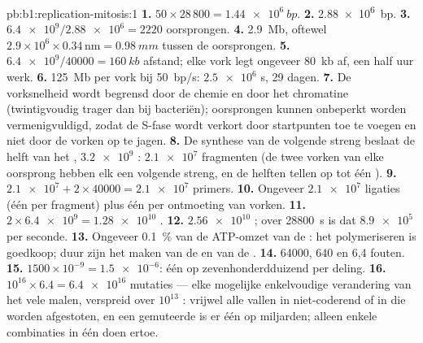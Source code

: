 \begin{solution}{pb:b1:replication-mitosis:1}
\textbf{1.} $50\times 28\,800 = \qty{1.44e6}{bp}$.
\textbf{2.} \qty{2.88e6}{bp}.
\textbf{3.} $\num{6.4e9}/\num{2.88e6} = 2220$ oorsprongen.
\textbf{4.} \qty{2.9}{Mb}, oftewel $2.9\times 10^6\times 0.34\,\mathrm{nm} =
\qty{0.98}{mm}$  tussen de oorsprongen.
\textbf{5.} $\num{6.4e9}/\num{40000} = \qty{160}{kb}$ afstand; elke vork legt
ongeveer \qty{80}{kb} af, een half uur werk.
\textbf{6.} \qty{125}{Mb} per vork bij \qty{50}{bp/s}: $\num{2.5e6}$ s, 29 dagen.
\textbf{7.} De vorksnelheid wordt begrensd door de chemie en door het chromatine
(twintigvoudig trager dan bij bacteriën); oorsprongen kunnen onbeperkt worden
vermenigvuldigd, zodat de S-fase wordt verkort door startpunten toe te voegen en
niet door de vorken op te jagen.
\textbf{8.} De synthese van de volgende streng beslaat de helft van het ,
$\num{3.2e9}$ : $\num{2.1e7}$ fragmenten (de twee vorken van elke
oorsprong hebben elk een volgende streng, en de helften tellen op tot één ).
\textbf{9.} $\num{2.1e7} + 2\times\num{40000} = \num{2.1e7}$ primers.
\textbf{10.} Ongeveer $\num{2.1e7}$ ligaties (één per fragment) plus één per
ontmoeting van vorken.
\textbf{11.} $2\times\num{6.4e9} = \num{1.28e10}$ .
\textbf{12.} $\num{2.56e10}$ ; over \qty{28800}{s} is dat $\num{8.9e5}$ per
seconde.
\textbf{13.} Ongeveer \qty{0.1}{\%} van de ATP-omzet van de : het polymeriseren
is goedkoop; duur zijn het maken van de  en van de .
\textbf{14.} \num{64000}, 640 en 6,4 fouten.
\textbf{15.} $1500\times 10^{-9} = \num{1.5e-6}$: één  op zevenhonderdduizend
per deling.
\textbf{16.} $10^{16}\times 6.4 = \num{6.4e16}$ mutaties --- elke mogelijke
enkelvoudige verandering van het  vele malen, verspreid over $10^{13}$
: vrijwel alle vallen in niet-coderend  of in  die worden
afgestoten, en een gemuteerde  is er één op miljarden; alleen enkele combinaties
in één  doen ertoe.

\end{solution}
